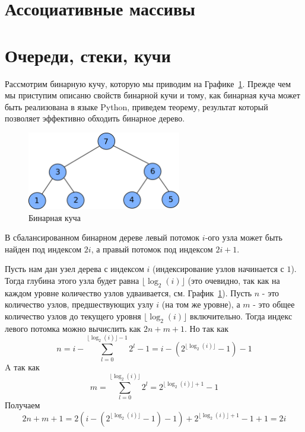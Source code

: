 \section{Ассоциативные массивы}

\section{Очереди, стеки, кучи}

Рассмотрим бинарную кучу, которую мы приводим на Графике~\ref{fig:binary_heap}. Прежде чем 
мы приступим описаню свойств бинарной кучи и тому, как бинарная куча может быть реализована в 
языке Python, приведем теорему, результат который позволяет эффективно обходить бинарное дерево. 

\begin{figure}
\centering
\includegraphics[width=0.6\textwidth]{graphics/binary_heap.png}
\caption{Бинарная куча}
\label{fig:binary_heap}
\end{figure}

\begin{theorem}
В сбалансированном бинарном дереве левый потомок $i$-ого узла может быть найден под 
индексом $2i$, а правый потомок под индексом $2i+1$.
\end{theorem}

Пусть нам дан узел дерева с индексом $i$ (индексирование узлов начинается с $1$). Тогда глубина этого узла 
будет равна $\lfloor \log_2(i) \rfloor$ (это очевидно, так как на каждом 
уровне количество узлов удваивается, см. График~\ref{fig:binary_heap}). Пусть $n$ - это количество узлов, 
предшествующих узлу $i$ (на том же уровне), а $m$ - это общее количество узлов
до текущего уровня $\lfloor \log_2(i) \rfloor$ включительно. Тогда индекс 
левого потомка можно вычислить как $2n + m+1$. Но так как
$$n = i - \sum_{l=0}^{\lfloor \log_2(i) \rfloor - 1} 2^l - 1 = i - (2^{\lfloor \log_2(i) \rfloor} - 1) - 1$$ 
A так как
$$m=\sum_{l=0}^{\lfloor \log_2(i) \rfloor} 2^l = 2^{\lfloor \log_2(i) \rfloor + 1} - 1$$
Получаем
$$2n+m+1= 2(i - (2^{\lfloor \log_2(i) \rfloor} - 1) - 1) + 2^{\lfloor \log_2(i) \rfloor + 1} - 1 + 1 = 2i$$ 

